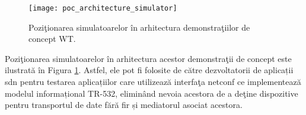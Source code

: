 \begin{figure}[t]
	\centering
	\texttt{[image: poc\_architecture\_simulator]}
	\caption{Poziţionarea simulatoarelor în arhitectura demonstraţiilor de concept WT.}
	\label{fig:poc_architecture_simulator}
\end{figure}


Poziţionarea simulatoarelor în arhitectura acestor demonstraţii de concept este ilustrată în Figura \ref{fig:poc_architecture_simulator}. Astfel, ele pot fi folosite de către dezvoltatorii de aplicații \gls{sdn} pentru testarea aplicațiilor care utilizează interfaţa \gls{netconf} ce implementează modelul informațional TR-532, eliminând nevoia acestora de a deţine dispozitive pentru transportul de date fără fir și mediatorul asociat acestora.